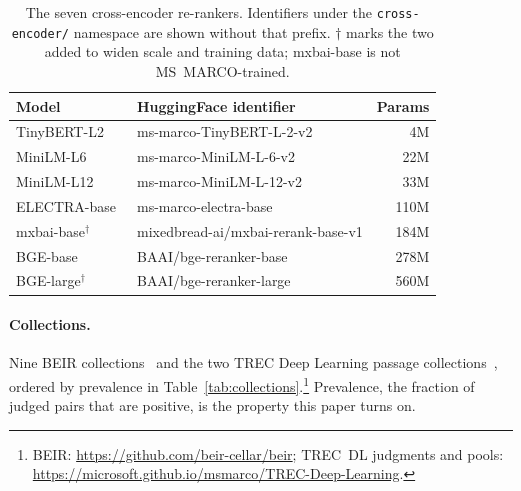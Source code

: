 \documentclass[sigconf,nonacm]{acmart}
\newcommand{\thead}[1]{\textbf{#1}}
\begin{document}
\begin{table}[t]
\centering
\caption{The seven cross-encoder re-rankers. Identifiers under the
\texttt{cross-encoder/} namespace are shown without that prefix. $\dagger$ marks the
two added to widen scale and training data; mxbai-base is not MS~MARCO-trained.}\label{tab:models}
\footnotesize
\setlength{\tabcolsep}{4pt}
\begin{tabular}{llr}
\toprule
\thead{Model} & \thead{HuggingFace identifier} & \thead{Params} \\
\midrule
TinyBERT-L2~\cite{jiao2020tinybert}  & ms-marco-TinyBERT-L-2-v2 & 4M \\
MiniLM-L6~\cite{wang2020minilm}    & ms-marco-MiniLM-L-6-v2   & 22M \\
MiniLM-L12~\cite{wang2020minilm}   & ms-marco-MiniLM-L-12-v2  & 33M \\
ELECTRA-base~\cite{clark2020electra} & ms-marco-electra-base  & 110M \\
mxbai-base$^{\dagger}$   & mixedbread-ai/mxbai-rerank-base-v1 & 184M \\
BGE-base~\cite{xiao2023bge}     & BAAI/bge-reranker-base       & 278M \\
BGE-large$^{\dagger}$~\cite{xiao2023bge}    & BAAI/bge-reranker-large & 560M \\
\bottomrule
\end{tabular}
\end{table}

\paragraph{Collections.}
Nine BEIR collections~\cite{thakur2021beir} and the two TREC Deep Learning passage
collections~\cite{craswell2020}, ordered by prevalence in
Table~\ref{tab:collections}.\footnote{BEIR: \url{https://github.com/beir-cellar/beir}; TREC~DL judgments and pools: \url{https://microsoft.github.io/msmarco/TREC-Deep-Learning}.} Prevalence, the fraction of judged pairs that are positive, is the property this paper turns on.
\end{document}
